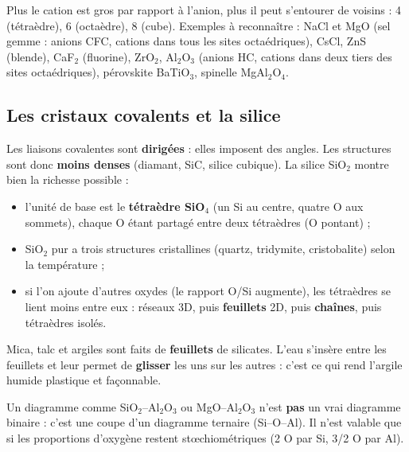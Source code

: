 
Plus le cation est gros par rapport à l'anion, plus il peut s'entourer de voisins : 4
(tétraèdre), 6 (octaèdre), 8 (cube). Exemples à reconnaître : NaCl et MgO (sel gemme : anions
CFC, cations dans tous les sites octaédriques), CsCl, ZnS (blende), CaF$_2$ (fluorine), ZrO$_2$,
Al$_2$O$_3$ (anions HC, cations dans deux tiers des sites octaédriques), pérovskite BaTiO$_3$,
spinelle MgAl$_2$O$_4$.

\subsection*{Les cristaux covalents et la silice}

Les liaisons covalentes sont \textbf{dirigées} : elles imposent des angles. Les structures
sont donc \textbf{moins denses} (diamant, SiC, silice cubique). La silice SiO$_2$ montre bien
la richesse possible :
\begin{itemize}
  \item l'unité de base est le \textbf{tétraèdre SiO$_4$} (un Si au centre, quatre O aux
        sommets), chaque O étant partagé entre deux tétraèdres (O \og pontant\fg{}) ;
  \item SiO$_2$ pur a trois structures cristallines (quartz, tridymite, cristobalite) selon la
        température ;
  \item si l'on ajoute d'autres oxydes (le rapport O/Si augmente), les tétraèdres se lient
        moins entre eux : réseaux 3D, puis \textbf{feuillets} 2D, puis \textbf{chaînes}, puis
        tétraèdres isolés.
\end{itemize}

\begin{propbox}[title=Pourquoi l'argile mouillée est malléable]
Mica, talc et argiles sont faits de \textbf{feuillets} de silicates. L'eau s'insère entre les
feuillets et leur permet de \textbf{glisser} les uns sur les autres : c'est ce qui rend l'argile
humide plastique et façonnable.
\end{propbox}

\begin{warnbox}[title={Diagrammes de phase \og quasi-binaires\fg{}}]
Un diagramme comme SiO$_2$--Al$_2$O$_3$ ou MgO--Al$_2$O$_3$ n'est \textbf{pas} un vrai
diagramme binaire : c'est une coupe d'un diagramme ternaire (Si--O--Al). Il n'est valable que
si les proportions d'oxygène restent stœchiométriques (2 O par Si, 3/2 O par Al).
\end{warnbox}

